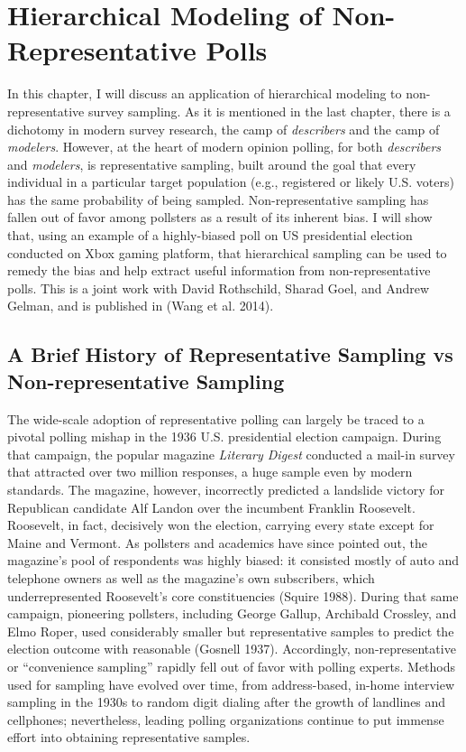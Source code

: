 \chapter{Hierarchical Modeling of Non-Representative Polls}


In this chapter, I will discuss an application of hierarchical modeling
to non-representative survey sampling. As it is mentioned in the last
chapter, there is a dichotomy in modern survey research, the camp of
\emph{describers} and the camp of \emph{modelers}. However, at the heart
of modern opinion polling, for both \emph{describers} and
\emph{modelers}, is representative sampling, built around the goal that
every individual in a particular target population (e.g., registered or
likely U.S. voters) has the same probability of being sampled.
Non-representative sampling has fallen out of favor among pollsters as a
result of its inherent bias. I will show that, using an example of a
highly-biased poll on US presidential election conducted on Xbox gaming
platform, that hierarchical sampling can be used to remedy the bias and
help extract useful information from non-representative polls. This is a
joint work with David Rothschild, Sharad Goel, and Andrew Gelman, and is
published in (Wang et al. 2014).

\section{A Brief History of Representative Sampling vs
Non-representative
Sampling}\label{a-brief-history-of-representative-sampling-vs-non-representative-sampling}

The wide-scale adoption of representative polling can largely be traced
to a pivotal polling mishap in the 1936 U.S. presidential election
campaign. During that campaign, the popular magazine \emph{Literary
Digest} conducted a mail-in survey that attracted over two million
responses, a huge sample even by modern standards. The magazine,
however, incorrectly predicted a landslide victory for Republican
candidate Alf Landon over the incumbent Franklin Roosevelt. Roosevelt,
in fact, decisively won the election, carrying every state except for
Maine and Vermont. As pollsters and academics have since pointed out,
the magazine's pool of respondents was highly biased: it consisted
mostly of auto and telephone owners as well as the magazine's own
subscribers, which underrepresented Roosevelt's core constituencies
(Squire 1988). During that same campaign, pioneering pollsters,
including George Gallup, Archibald Crossley, and Elmo Roper, used
considerably smaller but representative samples to predict the election
outcome with reasonable (Gosnell 1937). Accordingly, non-representative
or ``convenience sampling'' rapidly fell out of favor with polling
experts. Methods used for sampling have evolved over time, from
address-based, in-home interview sampling in the 1930s to random digit
dialing after the growth of landlines and cellphones; nevertheless,
leading polling organizations continue to put immense effort into
obtaining representative samples.

